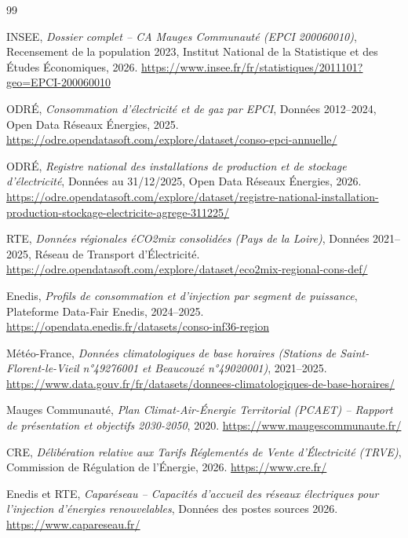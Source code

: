 \documentclass[12pt, a4paper]{report}
\begin{document}
\begin{thebibliography}{99}

INSEE, \textit{Dossier complet -- CA Mauges Communauté (EPCI 200060010)}, Recensement de la population 2023, Institut National de la Statistique et des Études Économiques, 2026. \url{https://www.insee.fr/fr/statistiques/2011101?geo=EPCI-200060010}

ODRÉ, \textit{Consommation d'électricité et de gaz par EPCI}, Données 2012--2024, Open Data Réseaux Énergies, 2025. \url{https://odre.opendatasoft.com/explore/dataset/conso-epci-annuelle/}

ODRÉ, \textit{Registre national des installations de production et de stockage d'électricité}, Données au 31/12/2025, Open Data Réseaux Énergies, 2026. \url{https://odre.opendatasoft.com/explore/dataset/registre-national-installation-production-stockage-electricite-agrege-311225/}

RTE, \textit{Données régionales éCO2mix consolidées (Pays de la Loire)}, Données 2021--2025, Réseau de Transport d'Électricité. \url{https://odre.opendatasoft.com/explore/dataset/eco2mix-regional-cons-def/}

Enedis, \textit{Profils de consommation et d'injection par segment de puissance}, Plateforme Data-Fair Enedis, 2024--2025. \url{https://opendata.enedis.fr/datasets/conso-inf36-region}

Météo-France, \textit{Données climatologiques de base horaires (Stations de Saint-Florent-le-Vieil n°49276001 et Beaucouzé n°49020001)}, 2021--2025. \url{https://www.data.gouv.fr/fr/datasets/donnees-climatologiques-de-base-horaires/}

Mauges Communauté, \textit{Plan Climat-Air-Énergie Territorial (PCAET) -- Rapport de présentation et objectifs 2030-2050}, 2020. \url{https://www.maugescommunaute.fr/}

CRE, \textit{Délibération relative aux Tarifs Réglementés de Vente d'Électricité (TRVE)}, Commission de Régulation de l'Énergie, 2026. \url{https://www.cre.fr/}

Enedis et RTE, \textit{Caparéseau -- Capacités d'accueil des réseaux électriques pour l'injection d'énergies renouvelables}, Données des postes sources 2026. \url{https://www.capareseau.fr/}


\end{thebibliography}
\end{document}
